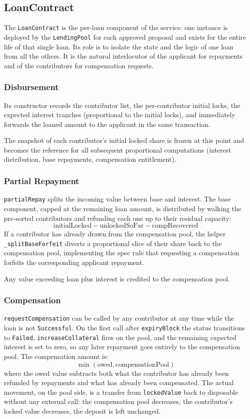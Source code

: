 \documentclass{report}
\begin{document}
\subsection*{LoanContract}
The \texttt{LoanContract} is the per-loan component of the service: one instance is deployed by the \texttt{LendingPool} for each approved proposal and exists for the entire life of that single loan. Its role is to isolate the state and the logic of one loan from all the others. It is the natural interlocutor of the applicant for repayments and of the contributors for compensation requests.

\subsubsection*{Disbursement}
Its constructor records the contributor list, the per-contributor initial locks, the expected interest tranches (proportional to the initial locks), and immediately forwards the loaned amount to the applicant in the same transaction.

The snapshot of each contributor's initial locked share is frozen at this point and becomes the reference for all subsequent proportional computations (interest distribution, base repayments, compensation entitlement).

\subsubsection*{Partial Repayment}
\texttt{partialRepay} splits the incoming value between base and interest. The base component, capped at the remaining loan amount, is distributed by walking the pre-sorted contributors and refunding each one up to their residual capacity:
$$\text{initialLocked} - \text{unlockedSoFar} - \text{compRecovered}$$
If a contributor has already drawn from the compensation pool, the helper \texttt{\_splitBaseForfeit} diverts a proportional slice of their share back to the compensation pool, implementing the spec rule that requesting a compensation forfeits the corresponding applicant repayment.

Any value exceeding loan plus interest is credited to the compensation pool. 

\subsubsection*{Compensation}
\texttt{requestCompensation} can be called by any contributor at any time while the loan is not \texttt{Successful}. On the first call after \texttt{expiryBlock} the status transitions to \texttt{Failed}, \texttt{increaseCollateral} fires on the pool, and the remaining expected interest is set to zero, so any later repayment goes entirely to the compensation pool. The compensation amount is:
$$\min(\text{owed}, \text{compensationPool})$$
where the owed value subtracts both what the contributor has already been refunded by repayments and what has already been compensated. The actual movement, on the pool side, is a transfer from \texttt{lockedValue} back to disposable without any external call: the compensation pool decreases, the contributor's locked value decreases, the deposit is left unchanged.
\end{document}
